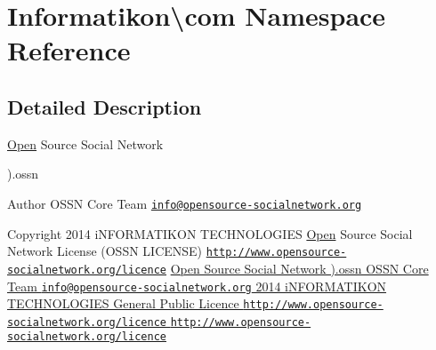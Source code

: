 \hypertarget{namespace_informatikon_1_1com}{}\section{Informatikon\textbackslash{}com Namespace Reference}
\label{namespace_informatikon_1_1com}


\subsection{Detailed Description}
\hyperlink{namespace_open}{Open} Source Social Network

).ossn \begin{DoxyAuthor}{Author}
O\+S\+SN Core Team \href{mailto:info@opensource-socialnetwork.org}{\tt info@opensource-\/socialnetwork.\+org} 
\end{DoxyAuthor}
\begin{DoxyCopyright}{Copyright}
2014 i\+N\+F\+O\+R\+M\+A\+T\+I\+K\+ON T\+E\+C\+H\+N\+O\+L\+O\+G\+I\+ES  \hyperlink{namespace_open}{Open} Source Social Network License (O\+S\+SN L\+I\+C\+E\+N\+SE) \href{http://www.opensource-socialnetwork.org/licence}{\tt http\+://www.\+opensource-\/socialnetwork.\+org/licence} \hyperlink{}{Open Source Social Network ).ossn  O\+S\+SN Core Team \href{mailto:info@opensource-socialnetwork.org}{\tt info@opensource-\/socialnetwork.\+org}  2014 i\+N\+F\+O\+R\+M\+A\+T\+I\+K\+ON T\+E\+C\+H\+N\+O\+L\+O\+G\+I\+ES  General Public Licence \href{http://www.opensource-socialnetwork.org/licence}{\tt http\+://www.\+opensource-\/socialnetwork.\+org/licence}  \href{http://www.opensource-socialnetwork.org/licence}{\tt http\+://www.\+opensource-\/socialnetwork.\+org/licence} }
\end{DoxyCopyright}
